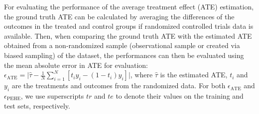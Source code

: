 \documentclass[letterpaper]{article} %
\begin{document}
%

For evaluating the performance of the average treatment effect (ATE) estimation, the ground truth ATE can be calculated by averaging the differences of the outcomes in the treated and control groups if randomized controlled trials data is available. Then, when comparing the ground truth ATE with the estimated ATE obtained from a non-randomized sample (observational sample or created via biased sampling) of the dataset, the performances can then be evaluated using the mean absolute error in ATE \cite{Hill2011,Shalit2016,Louizos2017,Yao2018_Twin} for evaluation: $\epsilon_{\text{ATE}} = \vert \hat{\tau} - \frac{1}{N}\sum\limits_{i=1}^N[t_i y_i - (1-t_i)y_i]\vert$,
where $\hat{\tau}$ is the estimated ATE, $t_i$ and $y_i$ are the treatments and outcomes from the randomized data. For both $\epsilon_{\text{ATE}}$ and $\epsilon_{\text{PEHE}}$, we use superscripts $tr$ and $te$ to denote their values on the training and test sets, respectively.
\end{document}
